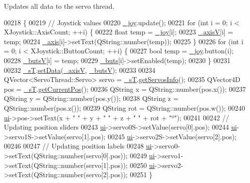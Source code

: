 Updates all data to the servo thread. 


\begin{DoxyCode}
00218 \{
00219     \textcolor{comment}{// Joystick values}
00220     \hyperlink{a00005_a671f35800890e518713e1946671d8730}{\_joy}.update();
00221     \textcolor{keywordflow}{for} (\textcolor{keywordtype}{int} i = 0; i < XJoystick::AxisCount; ++i) \{
00222         \textcolor{keywordtype}{float} temp = \hyperlink{a00005_a671f35800890e518713e1946671d8730}{\_joy}[i];
00223         \hyperlink{a00005_a20f66f574ed4c96d8dfc0013e1095f15}{\_axisV}[i] = temp;
00224         \hyperlink{a00005_a30c99d7a544f74b0650758e5cc7ead5a}{\_axis}[i]->setText(QString::number(temp));
00225     \}
00226     \textcolor{keywordflow}{for} (\textcolor{keywordtype}{int} i = 0; i < XJoystick::ButtonCount; ++i) \{
00227         \textcolor{keywordtype}{bool} temp = \hyperlink{a00005_a671f35800890e518713e1946671d8730}{\_joy}.button(i);
00228         \hyperlink{a00005_a519ae4630572cb63fbd04bce12fe8e77}{\_butsV}[i] = temp;
00229         \hyperlink{a00005_a8eaf474e1b8672f32873ed009e28ce8a}{\_buts}[i]->setEnabled(temp);
00230     \}
00231     
00232     \hyperlink{a00005_a97f8ecc7ecb930b796178cef7b975013}{\_sT}.\hyperlink{a00009_a8497ea56991b620981ce1fbf53d9ebdb}{setData}(\hyperlink{a00005_a20f66f574ed4c96d8dfc0013e1095f15}{\_axisV}, \hyperlink{a00005_a519ae4630572cb63fbd04bce12fe8e77}{\_butsV});
00233     
00234     QVector<ServoThread::Servo> servo = \hyperlink{a00005_a97f8ecc7ecb930b796178cef7b975013}{\_sT}.\hyperlink{a00009_a5fd8ef13314428f5ba7646730cc58f1c}{getServosInfo}();
00235     QVector4D pos = \hyperlink{a00005_a97f8ecc7ecb930b796178cef7b975013}{\_sT}.\hyperlink{a00009_a19ad0fe74d9f35220bf2864dbcecce2a}{getCurrentPos}();
00236     QString x = QString::number(pos.x());
00237     QString y = QString::number(pos.y());
00238     QString z = QString::number(pos.z());
00239     QString rot = QString::number(pos.w());
00240     \hyperlink{a00005_a35466a70ed47252a0191168126a352a5}{ui}->pos->setText(x + \textcolor{stringliteral}{" "} + y + \textcolor{stringliteral}{" "} + z + \textcolor{stringliteral}{" "} + rot + \textcolor{stringliteral}{"º"});
00241     
00242     \textcolor{comment}{// Updating position sliders}
00243     \hyperlink{a00005_a35466a70ed47252a0191168126a352a5}{ui}->servo0S->setValue(servo[0].pos);
00244     \hyperlink{a00005_a35466a70ed47252a0191168126a352a5}{ui}->servo1S->setValue(servo[1].pos);
00245     \hyperlink{a00005_a35466a70ed47252a0191168126a352a5}{ui}->servo2S->setValue(servo[2].pos);
00246     
00247     \textcolor{comment}{// Updating position labels}
00248     \hyperlink{a00005_a35466a70ed47252a0191168126a352a5}{ui}->servo0->setText(QString::number(servo[0].pos));
00249     \hyperlink{a00005_a35466a70ed47252a0191168126a352a5}{ui}->servo1->setText(QString::number(servo[1].pos));
00250     \hyperlink{a00005_a35466a70ed47252a0191168126a352a5}{ui}->servo2->setText(QString::number(servo[2].pos));    
00251 \}
\end{DoxyCode}
\hypertarget{a00005_a6fd62e117414acda4fe6a93c453dfb93}{}
